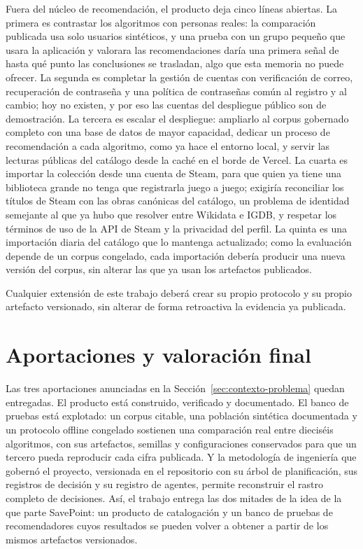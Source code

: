 Fuera del núcleo de recomendación, el producto deja cinco líneas abiertas. La primera es contrastar los algoritmos
con personas reales: la comparación publicada usa solo usuarios sintéticos, y una prueba con un grupo pequeño que
usara la aplicación y valorara las recomendaciones daría una primera señal de hasta qué punto las conclusiones se
trasladan, algo que esta memoria no puede ofrecer. La segunda es completar la gestión de cuentas con verificación
de correo, recuperación de contraseña y una política de contraseñas común al registro y al cambio; hoy no existen,
y por eso las cuentas del despliegue público son de demostración. La tercera es escalar el despliegue: ampliarlo al
corpus gobernado completo con una base de datos de mayor capacidad, dedicar un proceso de recomendación a cada
algoritmo, como ya hace el entorno local, y servir las lecturas públicas del catálogo desde la caché en el borde de
Vercel. La cuarta es importar la colección desde una cuenta de Steam, para que quien ya tiene una biblioteca grande
no tenga que registrarla juego a juego; exigiría reconciliar los títulos de Steam con las obras canónicas del
catálogo, un problema de identidad semejante al que ya hubo que resolver entre Wikidata e IGDB, y respetar los
términos de uso de la API de Steam y la privacidad del perfil. La quinta es una importación diaria del catálogo que
lo mantenga actualizado; como la evaluación depende de un corpus congelado, cada importación debería producir una
nueva versión del corpus, sin alterar las que ya usan los artefactos publicados.

Cualquier extensión de este trabajo deberá crear su propio protocolo y su propio artefacto
versionado, sin alterar de forma retroactiva la evidencia ya publicada.

\section{Aportaciones y valoración final}\label{sec:conc-aportaciones}\label{sec:conc-cierre}

Las tres aportaciones anunciadas en la Sección~\ref{sec:contexto-problema} quedan entregadas.
El producto está construido, verificado y documentado. El banco de pruebas está explotado: un
corpus citable, una población sintética documentada y un protocolo offline congelado sostienen
una comparación real entre dieciséis algoritmos, con sus artefactos, semillas y
configuraciones conservados para que un tercero pueda reproducir cada cifra publicada. Y la
metodología de ingeniería que gobernó el proyecto, versionada en el repositorio con su árbol
de planificación, sus registros de decisión y su registro de agentes, permite reconstruir el
rastro completo de decisiones. Así, el trabajo entrega las dos mitades de la idea de la que
parte SavePoint: un producto de catalogación y un banco de pruebas de recomendadores cuyos
resultados se pueden volver a obtener a partir de los mismos artefactos versionados.


